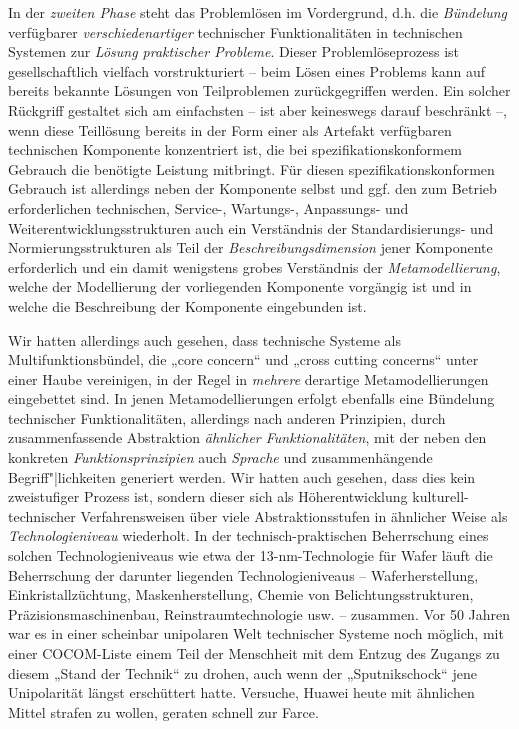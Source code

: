 \documentclass[11pt,a4paper]{article}
\begin{document}
In der \emph{zweiten Phase} steht das Problemlösen im Vordergrund, d.h. die
\emph{Bündelung} verfügbarer \emph{verschiedenartiger} technischer
Funktionalitäten in technischen Systemen zur \emph{Lösung praktischer
  Probleme}.  Dieser Problemlöseprozess ist gesellschaftlich vielfach
vorstrukturiert -- beim Lösen eines Problems kann auf bereits bekannte
Lösungen von Teilproblemen zurückgegriffen werden. Ein solcher Rückgriff
gestaltet sich am einfachsten -- ist aber keineswegs darauf beschränkt --,
wenn diese Teillösung bereits in der Form einer als Artefakt verfügbaren
technischen Komponente konzentriert ist, die bei spezifikationskonformem
Gebrauch die benötigte Leistung mitbringt.  Für diesen spezifikationskonformen
Gebrauch ist allerdings neben der Komponente selbst und ggf. den zum Betrieb
erforderlichen technischen, Service-, Wartungs-, Anpassungs- und
Weiterentwicklungsstrukturen auch ein Verständnis der Standardisierungs- und
Normierungsstrukturen als Teil der \emph{Beschreibungsdimension} jener
Komponente erforderlich und ein damit wenigstens grobes Verständnis der
\emph{Metamodellierung}, welche der Modellierung der vorliegenden Komponente
vorgängig ist und in welche die Beschreibung der Komponente eingebunden ist.

Wir hatten allerdings auch gesehen, dass technische Systeme als
Multifunktionsbündel, die „core concern“ und „cross cutting concerns“ unter
einer Haube vereinigen, in der Regel in \emph{mehrere} derartige
Metamodellierungen eingebettet sind. In jenen Metamodellierungen erfolgt
ebenfalls eine Bündelung technischer Funktionalitäten, allerdings nach anderen
Prinzipien, durch zusammenfassende Abstraktion \emph{ähnlicher
  Funktionalitäten}, mit der neben den konkreten \emph{Funktionsprinzipien}
auch \emph{Sprache} und zusammenhängende Begriff"|lichkeiten generiert werden.
Wir hatten auch gesehen, dass dies kein zweistufiger Prozess ist, sondern
dieser sich als Höherentwicklung kulturell-technischer Verfahrensweisen über
viele Abstraktionsstufen in ähnlicher Weise als \emph{Technologieniveau}
wiederholt. In der technisch-praktischen Beherrschung eines solchen
Technologieniveaus wie etwa der 13-nm-Technologie für Wafer läuft die
Beherrschung der darunter liegenden Technologieniveaus -- Waferherstellung,
Einkristallzüchtung, Maskenherstellung, Chemie von Belichtungsstrukturen,
Präzisionsmaschinenbau, Reinstraumtechnologie usw. -- zusammen. Vor 50 Jahren
war es in einer scheinbar unipolaren Welt technischer Systeme noch möglich,
mit einer COCOM-Liste einem Teil der Menschheit mit dem Entzug des Zugangs zu
diesem „Stand der Technik“ zu drohen, auch wenn der „Sputnikschock“ jene
Unipolarität längst erschüttert hatte.  Versuche, Huawei heute mit ähnlichen
Mittel strafen zu wollen, geraten schnell zur Farce.
\end{document}
